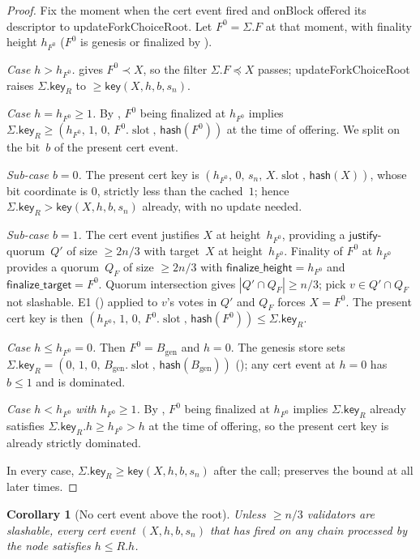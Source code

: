 \documentclass{article}
\newcommand{\genesis}{\ensuremath{B_{\mathrm{gen}}}}
\newcommand{\slot}[0]{\ensuremath{\operatorname{\mathrm{slot}}}}
\newcommand{\just}{\ensuremath{\mathsf{justify}}\xspace}
\newcommand{\finalizeHeight}{\mathsf{finalize\_height}}
\newcommand{\finalizeTarget}{\mathsf{finalize\_target}}
\newcommand{\hash}{\mathsf{hash}}
\newcommand{\key}{\mathsf{key}}
\newcommand{\onBlock}{\textsf{onBlock}\xspace}
\newcommand{\updateForkChoiceRoot}{\textsf{updateForkChoiceRoot}\xspace}
\theoremstyle{plain}
\newtheorem{corollary}{Corollary}
\theoremstyle{definition}
\theoremstyle{remark}
\begin{document}
\begin{proof}
Fix the moment when the cert event fired and \onBlock offered its descriptor to \updateForkChoiceRoot. Let $F^0 = \Sigma.F$ at that moment, with finality height $h_{F^0}$ ($F^0$ is genesis or finalized by ).

\emph{Case $h > h_{F^0}$.}  gives $F^0 \prec X$, so the filter $\Sigma.F \preceq X$ passes; \updateForkChoiceRoot raises $\Sigma.\key_R$ to $\geq \key(X, h, b, s_n)$.

\emph{Case $h = h_{F^0} \geq 1$.}
By , $F^0$ being finalized at $h_{F^0}$ implies $\Sigma.\key_R \geq (h_{F^0},\, 1,\, 0,\, F^0.\slot,\, \hash(F^0))$ at the time of offering. We split on the bit~$b$ of the present cert event.

\emph{Sub-case $b = 0$.} The present cert key is $(h_{F^0},\, 0,\, s_n,\, X.\slot,\, \hash(X))$, whose bit coordinate is $0$, strictly less than the cached~$1$; hence $\Sigma.\key_R > \key(X, h, b, s_n)$ already, with no update needed.

\emph{Sub-case $b = 1$.} The cert event justifies $X$ at height~$h_{F^0}$, providing a \just-quorum~$Q'$ of size $\geq 2n/3$ with target~$X$ at height~$h_{F^0}$. Finality of $F^0$ at $h_{F^0}$ provides a quorum~$Q_F$ of size $\geq 2n/3$ with $\finalizeHeight = h_{F^0}$ and $\finalizeTarget = F^0$. Quorum intersection gives $|Q' \cap Q_F| \geq n/3$; pick $v \in Q' \cap Q_F$ not slashable. E1 () applied to $v$'s votes in $Q'$ and $Q_F$ forces $X = F^0$. The present cert key is then $(h_{F^0},\, 1,\, 0,\, F^0.\slot,\, \hash(F^0)) \leq \Sigma.\key_R$.

\emph{Case $h \leq h_{F^0} = 0$.} Then $F^0 = \genesis$ and $h = 0$. The genesis store sets $\Sigma.\key_R = (0,\, 1,\, 0,\, \genesis.\slot,\, \hash(\genesis))$ (); any cert event at $h = 0$ has $b \leq 1$ and is dominated.

\emph{Case $h < h_{F^0}$ with $h_{F^0} \geq 1$.} By , $F^0$ being finalized at $h_{F^0}$ implies $\Sigma.\key_R$ already satisfies $\Sigma.\key_R.h \geq h_{F^0} > h$ at the time of offering, so the present cert key is already strictly dominated.

In every case, $\Sigma.\key_R \geq \key(X, h, b, s_n)$ after the call;  preserves the bound at all later times.
\end{proof}

\begin{corollary}[No cert event above the root]\label{rev:cor:no-high-cn}
Unless $\geq n/3$ validators are slashable, every cert event $(X, h, b, s_n)$ that has fired on any chain processed by the node satisfies $h \leq R.h$.
\end{corollary}
\end{document}
